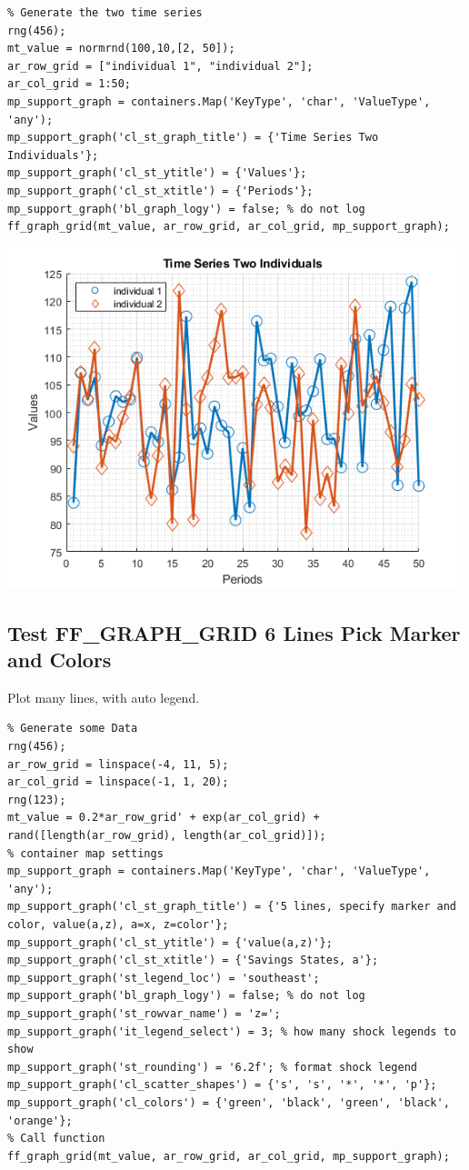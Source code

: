 \documentclass[
]{book}
\begin{document}
\begin{verbatim}
% Generate the two time series
rng(456);
mt_value = normrnd(100,10,[2, 50]);
ar_row_grid = ["individual 1", "individual 2"];
ar_col_grid = 1:50;
mp_support_graph = containers.Map('KeyType', 'char', 'ValueType', 'any');
mp_support_graph('cl_st_graph_title') = {'Time Series Two Individuals'};
mp_support_graph('cl_st_ytitle') = {'Values'};
mp_support_graph('cl_st_xtitle') = {'Periods'};
mp_support_graph('bl_graph_logy') = false; % do not log
ff_graph_grid(mt_value, ar_row_grid, ar_col_grid, mp_support_graph);
\end{verbatim}

\includegraphics[width=5.20833in,height=\textheight]{img/fx_graph_grid_images/figure_4.png}

\hypertarget{test-ff_graph_grid-6-lines-pick-marker-and-colors}{%
\subsection{Test FF\_GRAPH\_GRID 6 Lines Pick Marker and Colors}\label{test-ff_graph_grid-6-lines-pick-marker-and-colors}}

Plot many lines, with auto legend.

\begin{verbatim}
% Generate some Data
rng(456);
ar_row_grid = linspace(-4, 11, 5);
ar_col_grid = linspace(-1, 1, 20);
rng(123);
mt_value = 0.2*ar_row_grid' + exp(ar_col_grid) + rand([length(ar_row_grid), length(ar_col_grid)]);
% container map settings
mp_support_graph = containers.Map('KeyType', 'char', 'ValueType', 'any');
mp_support_graph('cl_st_graph_title') = {'5 lines, specify marker and color, value(a,z), a=x, z=color'};
mp_support_graph('cl_st_ytitle') = {'value(a,z)'};
mp_support_graph('cl_st_xtitle') = {'Savings States, a'};
mp_support_graph('st_legend_loc') = 'southeast';
mp_support_graph('bl_graph_logy') = false; % do not log
mp_support_graph('st_rowvar_name') = 'z=';
mp_support_graph('it_legend_select') = 3; % how many shock legends to show
mp_support_graph('st_rounding') = '6.2f'; % format shock legend
mp_support_graph('cl_scatter_shapes') = {'s', 's', '*', '*', 'p'};
mp_support_graph('cl_colors') = {'green', 'black', 'green', 'black', 'orange'};
% Call function
ff_graph_grid(mt_value, ar_row_grid, ar_col_grid, mp_support_graph);
\end{verbatim}
\end{document}
